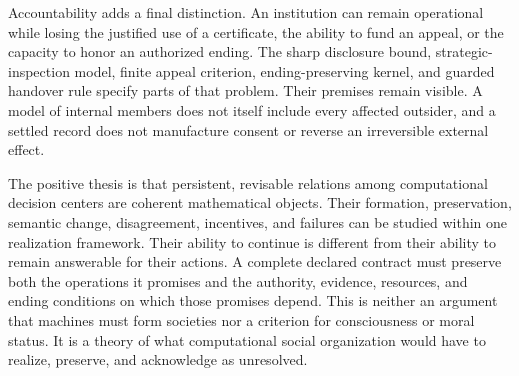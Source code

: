 \documentclass[11pt,letterpaper]{article}
\theoremstyle{plain}
\theoremstyle{definition}
\theoremstyle{remark}
\begin{document}
Accountability adds a final distinction. An institution can remain operational while losing the justified use of a certificate, the ability to fund an appeal, or the capacity to honor an authorized ending. The sharp disclosure bound, strategic-inspection model, finite appeal criterion, ending-preserving kernel, and guarded handover rule specify parts of that problem. Their premises remain visible. A model of internal members does not itself include every affected outsider, and a settled record does not manufacture consent or reverse an irreversible external effect.

The positive thesis is that persistent, revisable relations among computational decision centers are coherent mathematical objects. Their formation, preservation, semantic change, disagreement, incentives, and failures can be studied within one realization framework. Their ability to continue is different from their ability to remain answerable for their actions. A complete declared contract must preserve both the operations it promises and the authority, evidence, resources, and ending conditions on which those promises depend. This is neither an argument that machines must form societies nor a criterion for consciousness or moral status. It is a theory of what computational social organization would have to realize, preserve, and acknowledge as unresolved.

\clearpage
\appendix
\end{document}
